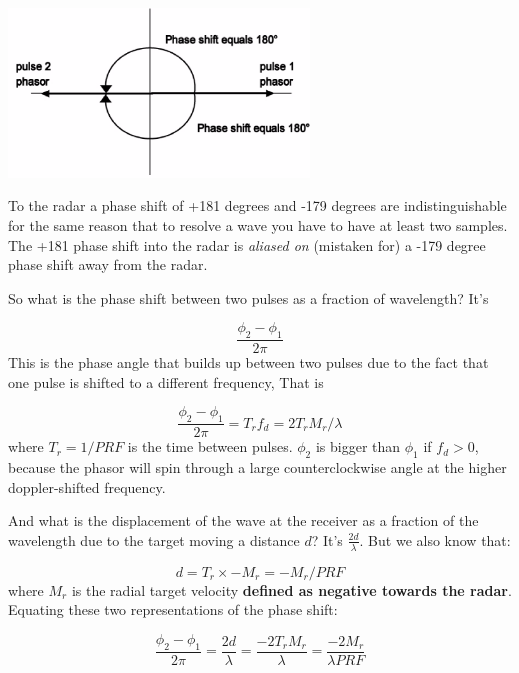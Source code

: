 \documentclass[12pt]{article}
\begin{document}
\begin{itemize}
\begin{itemize}
\includegraphics[width=0.6\textwidth]{figures_tex/alias.png}

To the radar a phase shift of +181 degrees and -179 degrees 
are indistinguishable for the same reason that to resolve a wave
you have to have at least two samples.  The +181 phase shift
into the radar is \textit{aliased on} (mistaken for) a 
-179 degree phase shift away from the radar.


\end{itemize}

So what is the phase shift between two pulses as a fraction of
wavelength? It's

\begin{equation}
  \label{eq:phi1}
  \frac{ \phi_2 - \phi_1}{2 \pi}
\end{equation}
This is the phase angle that builds up between two pulses due
to the fact that one pulse is shifted to a different frequency,
That is

\begin{equation}
  \label{eq:phi1}
  \frac{ \phi_2 - \phi_1}{2 \pi} = T_r f_d = 2 T_r M_r/\lambda
\end{equation}
where $T_r = 1/PRF$ is the time between pulses.  $\phi_2$ is bigger
than $\phi_1$ if $f_d > 0$, because the phasor will spin through
a large counterclockwise angle at the higher doppler-shifted
frequency.

And what is the displacement of the wave at the receiver as
a fraction of the wavelength due to the target moving a distance
$d$?  It's  $\frac{ 2d}{\lambda}$.
But we also know that:

\begin{equation}
  \label{eq:dpulse}
  d=T_r \times -M_r = -M_r/PRF
\end{equation}
where $M_r$ is the
radial target velocity  \textbf{defined as negative towards the radar}.  Equating these two representations of
the phase shift:

\begin{equation}
  \label{eq:phi2}
  \frac{ \phi_2 - \phi_1}{2 \pi} = \frac{2d }{\lambda}
= \frac{-2 T_r M_r }{\lambda} = \frac{ -2M_r}{\lambda PRF}
\end{equation}


\end{itemize}
\end{document}
